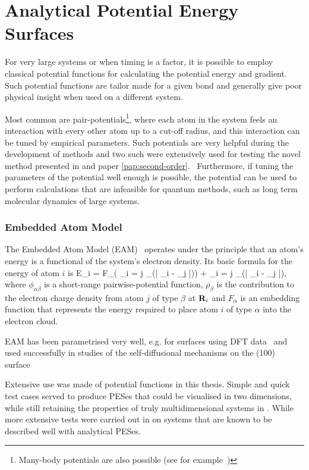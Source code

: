 \section{Analytical Potential Energy Surfaces}
\label{sec:potentials}
For very large systems or when timing is a factor, it is possible to employ classical potential functions for calculating the potential energy and gradient.
Such potential functions are tailor made for a given bond and generally give poor physical insight when used on a different system.

Most common are pair-potentials\footnote{Many-body potentials are also possible (see for example~\cite{stillinger-weber-potential})}, where each atom in the system feels an interaction with every other atom up to a cut-off radius, and this interaction can be tuned by empirical parameters.
Such potentials are very helpful during the development of methods and two such were extensively used for testing the novel method presented in  and paper \ref{pap:second-order}.~\cite{eam-1983, eam-1986, emt-1987, emt-1996}
Furthermore, if tuning the parameters of the potential well enough is possible, the potential can be used to perform calculations that are infeasible for quantum methods, such as long term molecular dynamics of large systems.~\citemiss

\subsubsection{Embedded Atom Model}
The Embedded Atom Model (EAM)~\cite{eam-1983} operates under the principle that an atom's energy is a functional of the system's electron density.
Its basic formula for the energy of atom $i$ is
E_i = F_\alpha \left( \sum_{i \not= j} \rho_\beta(\left| \vR_i - \vR_j \right|)\right) +  \sum_{i \not= j}   \phi_{\alpha\beta}(\left| \vR_i - \vR_j \right|),
\eeq
where $\phi_{\alpha\beta}$ is a short-range pairwise-potential function, $\rho_\beta$ is the contribution to the electron charge density from atom $j$ of type $\beta$ at ${\mathrm{\mathbf{\bm{R}}}}_i$ and $F_\alpha$ is an embedding function that represents the energy required to place atom $i$ of type $\alpha$ into the electron cloud.

EAM has been parametrised very well, e.g. for  surfaces using DFT data~\cite{eam-1986} and used successfully in studies of the self-diffusional mechanisms on the (100) surface~\cite{dimer-original-1999}

Extensive use was made of potential functions in this thesis.
Simple and quick test cases served to produce PESes that could be visualised in two dimensions, while still retaining the properties of truly multidimensional systems in .
While more extensive tests were carried out in  on systems that are known to be described well with analytical PESes.

